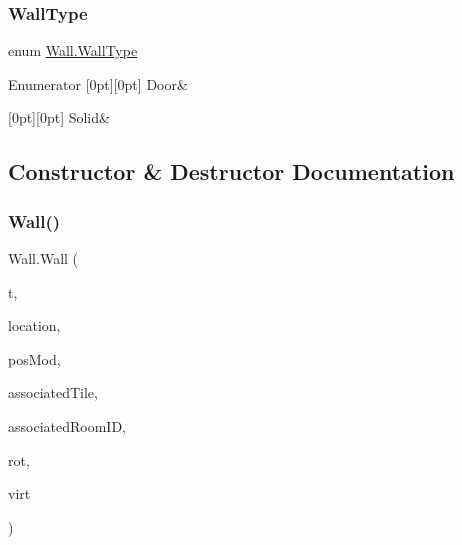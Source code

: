 \subsubsection{\texorpdfstring{Wall\+Type}{WallType}}
{\footnotesize\ttfamily enum \mbox{\hyperlink{class_wall_a1366d94ac70428624a6703d7db89638d}{Wall.\+Wall\+Type}}\hspace{0.3cm}{\ttfamily [strong]}}

\begin{DoxyEnumFields}{Enumerator}
[0pt][0pt]{}\mbox{\label{class_wall_a1366d94ac70428624a6703d7db89638daf44e14d49cd011d1e873d9fe0c4624f1}} 
Door&\\
\hline

[0pt][0pt]{}\mbox{\label{class_wall_a1366d94ac70428624a6703d7db89638dae41480b6bbfbf7407974a88d3d34f4fa}} 
Solid&\\
\hline

\end{DoxyEnumFields}


\subsection{Constructor \& Destructor Documentation}
\mbox{\label{class_wall_a4c5f79551eaa6006ef8d243c6cb4407f}} 
\subsubsection{\texorpdfstring{Wall()}{Wall()}}
{\footnotesize\ttfamily Wall.\+Wall (\begin{DoxyParamCaption}\item[{\mbox{\hyperlink{class_wall_a1366d94ac70428624a6703d7db89638d}{Wall\+Type}}}]{t,  }\item[{Vector2 \mbox{[}$\,$\mbox{]}}]{location,  }\item[{float}]{pos\+Mod,  }\item[{Vector2\+Int}]{associated\+Tile,  }\item[{uint}]{associated\+Room\+ID,  }\item[{\mbox{\hyperlink{class_wall_a0ff16a0e73bfc8f0d89c5fd6849e3a97}{Wall\+Rotation}}}]{rot,  }\item[{\mbox{\hyperlink{class_museum}{Museum}}}]{virt }\end{DoxyParamCaption})}

